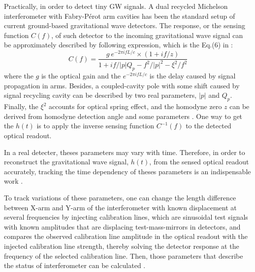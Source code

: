 Practically, in order to detect tiny GW signals. A dual recycled Michelson interferometer with Fabry-P\'erot arm cavities has been the standard setup of current ground-based gravitational wave detectors. The response, or the sensing function $C(f)$, of such detector to the incoming gravitational wave signal can be approximately described by following expression, which is the Eq.(6) in \cite{mif:response}:
\begin{equation}
\label{eq:mifres}
    C(f)=\frac{
    g~ e^{-2 \pi i f L/c} \times (1+ i f/z)
}{
    1+ i f/|p| Q_p - f^2 /|p|^2 - \xi^2/f^2
}
\end{equation}
where the $g$ is the optical gain and the $e^{-2 \pi i f L/c}$ is the delay caused by signal propagation in arms. Besides, a coupled-cavity pole with some shift caused by signal recycling cavity can be described by two real parameters, $|p|$ and $Q_p$. Finally, the $\xi^2$ accounts for optical spring effect, and the homodyne zero $z$ can be derived from homodyne detection angle and some parameters \cite{mif:response}. One way to get the $h(t)$ is to apply the inverse sensing function $C^{-1}(f)$ to the detected optical readout.








In a real detecter, theses parameters may vary with time. Therefore, in order to reconstruct the gravitational wave signal, $h(t)$, from the sensed optical readout accurately, tracking the time dependency of theses parameters is an indispensable work \cite{ligo:reconstruction,ligo:timedep}. 

To track variations of these parameters, one can change the length difference between X-arm and Y-arm of the interferometer with known displacement at several frequencies by injecting calibration lines, which are sinusoidal test signals with known amplitudes that are displacing test-mass-mirrors in detectors, and compares the observed calibration line amplitude in the optical readout with the injected calibration line strength, thereby solving the detector response at the frequency of the selected calibration line. Then, those parameters that describe the status of interferometer can be calculated \cite{ligo:timedep}.

